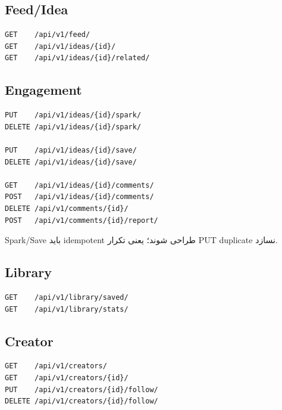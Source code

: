 \subsection{Feed/Idea}

\begin{latin}
\begin{lstlisting}
GET    /api/v1/feed/
GET    /api/v1/ideas/{id}/
GET    /api/v1/ideas/{id}/related/
\end{lstlisting}
\end{latin}

\subsection{Engagement}

\begin{latin}
\begin{lstlisting}
PUT    /api/v1/ideas/{id}/spark/
DELETE /api/v1/ideas/{id}/spark/

PUT    /api/v1/ideas/{id}/save/
DELETE /api/v1/ideas/{id}/save/

GET    /api/v1/ideas/{id}/comments/
POST   /api/v1/ideas/{id}/comments/
DELETE /api/v1/comments/{id}/
POST   /api/v1/comments/{id}/report/
\end{lstlisting}
\end{latin}

Spark/Save باید idempotent طراحی شوند؛ یعنی تکرار PUT duplicate نسازد.

\subsection{Library}

\begin{latin}
\begin{lstlisting}
GET    /api/v1/library/saved/
GET    /api/v1/library/stats/
\end{lstlisting}
\end{latin}

\subsection{Creator}

\begin{latin}
\begin{lstlisting}
GET    /api/v1/creators/
GET    /api/v1/creators/{id}/
PUT    /api/v1/creators/{id}/follow/
DELETE /api/v1/creators/{id}/follow/
\end{lstlisting}
\end{latin}

